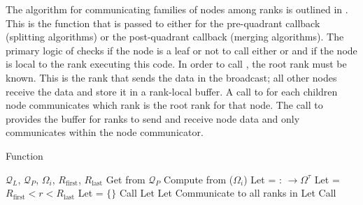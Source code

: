 The algorithm for communicating families of nodes among ranks is outlined in . This is the function that is passed to  either for the pre-quadrant callback (splitting algorithms) or the post-quadrant callback (merging algorithms). The primary logic of  checks if the node is a leaf or not to call either  or  and if the node is local to the rank executing this code. In order to call , the root rank must be known. This is the rank that sends the data in the broadcast; all other nodes receive the data and store it in a rank-local buffer. A call to  for each children node communicates which rank is the root rank for that node. The call to  provides the buffer for ranks to send and receive node data and only communicates within the node communicator.

\begin{algorithm}
    \caption{ Function}
    \begin{algorithmic}[0]
        \Require $\mathcal{Q}_{L}$, $\mathcal{Q}_{P}$, $\Omega_i$, $R_{\text{first}}$, $R_{\text{last}}$
        \State Get  from $\mathcal{Q}_{P}$
        \State Compute  from ($\Omega_i$)
        \State Let  = :  $\rightarrow \Omega^{\tau}$
        \State Let  = $R_{\text{first}} < r < R_{\text{last}}$
        \State Let  = $\{\}$
            \State Call 
        \Else
                    \State Let 
                \EndFor
                    \State Let 
                    \State Communicate  to all ranks in 
                    \State Let 
                \EndFor
            \EndIf
                \State Call 
            \EndIf
        \EndIf
    \end{algorithmic}
    \label{alg:p4est_search_merge_split}
\end{algorithm}